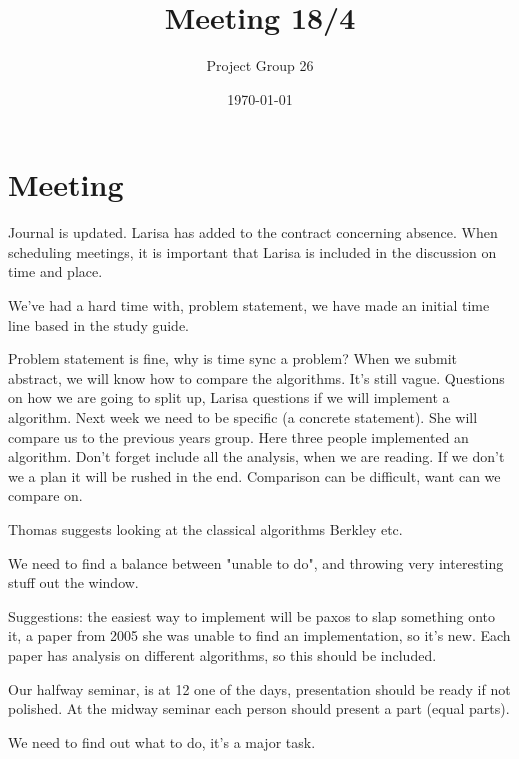 \documentclass{article}
\title{Meeting 18/4}
\author{Project Group 26}
\date{\today}
\begin{document}
\maketitle

\section{Meeting}

Journal is updated. Larisa has added to the contract concerning absence. When scheduling meetings, it is important that Larisa is included in the discussion on time and place.

We've had a hard time with, problem statement, we have made an initial time line based in the study guide.

Problem statement is fine, why is time sync a problem? When we submit abstract, we will know how to compare the algorithms. It's still vague. Questions on how we are going to split up, Larisa questions if we will implement a algorithm. Next week we need to be specific (a concrete statement). She will compare us to the previous years group. Here three people implemented an algorithm. Don't forget include all the analysis, when we are reading.
If we don't we a plan it will be rushed in the end. Comparison can be difficult, want can we compare on. 

Thomas suggests looking at the classical algorithms Berkley etc.

We need to find a balance between "unable to do", and throwing very interesting stuff out the window.

Suggestions: the easiest way to implement will be paxos to slap something onto it, a paper from 2005 she was unable to find an implementation, so it's new. Each paper has analysis on different algorithms, so this should be included.   

Our halfway seminar, is at 12 one of the days, presentation should be ready if not polished. At the midway seminar each person should present a part (equal parts).

We need to find out what to do, it's a major task. 
\end{document}
